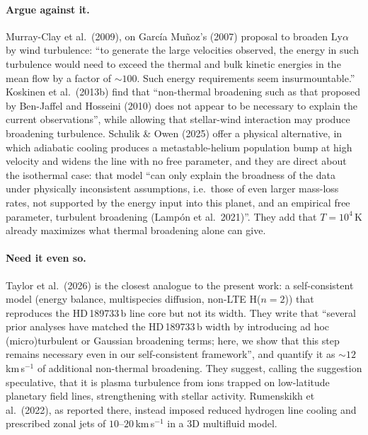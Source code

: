 \documentclass[english,a4paper]{my_memo}
\begin{document}
\paragraph{Argue against it.}
Murray-Clay et al.\ (2009), on Garc\'ia Mu\~noz's (2007) proposal to
broaden Ly$\alpha$ by wind turbulence: ``to generate the large velocities
observed, the energy in such turbulence would need to exceed the thermal and
bulk kinetic energies in the mean flow by a factor of $\sim 100$. Such
energy requirements seem insurmountable.'' Koskinen et al.\ (2013b) find
that ``non-thermal broadening such as that proposed by Ben-Jaffel and
Hosseini (2010) does not appear to be necessary to explain the current
observations'', while allowing that stellar-wind interaction may produce
broadening turbulence. Schulik \& Owen (2025) offer a physical alternative,
in which adiabatic cooling produces a metastable-helium population bump at
high velocity and widens the line with no free parameter, and they are
direct about the isothermal case: that model ``can only explain the
broadness of the data under physically inconsistent assumptions, i.e.\ those
of even larger mass-loss rates, not supported by the energy input into this
planet, and an empirical free parameter, turbulent broadening (Lamp\'on et
al.\ 2021)''. They add that $T = 10^{4}$\,K already maximizes what thermal
broadening alone can give.

\paragraph{Need it even so.}
Taylor et al.\ (2026) is the closest analogue to the present work: a
self-consistent model (energy balance, multispecies diffusion, non-LTE
H($n=2$)) that reproduces the HD\,189733\,b line core but not its width.
They write that ``several prior analyses have matched the HD\,189733\,b width
by introducing ad hoc (micro)turbulent or Gaussian broadening terms; here, we
show that this step remains necessary even in our self-consistent
framework'', and quantify it as $\sim 12$\,km\,s$^{-1}$ of additional
non-thermal broadening. They suggest, calling the suggestion speculative,
that it is plasma turbulence from ions trapped on low-latitude planetary
field lines, strengthening with stellar activity. Rumenskikh et al.\ (2022),
as reported there, instead imposed reduced hydrogen line cooling and
prescribed zonal jets of $10$--$20$\,km\,s$^{-1}$ in a 3D multifluid
model.
\end{document}

